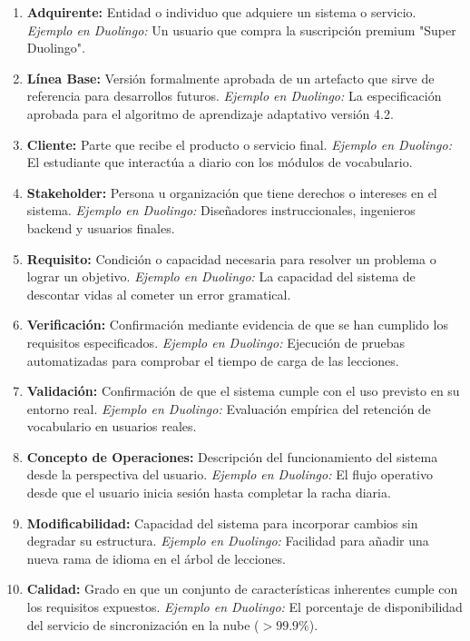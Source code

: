 \documentclass[11pt, a4paper]{article}
\begin{document}
\begin{enumerate}
    \item \textbf{Adquirente:} Entidad o individuo que adquiere un sistema o servicio. \textit{Ejemplo en Duolingo:} Un usuario que compra la suscripción premium "Super Duolingo".
    \item \textbf{Línea Base:} Versión formalmente aprobada de un artefacto que sirve de referencia para desarrollos futuros. \textit{Ejemplo en Duolingo:} La especificación aprobada para el algoritmo de aprendizaje adaptativo versión 4.2.
    \item \textbf{Cliente:} Parte que recibe el producto o servicio final. \textit{Ejemplo en Duolingo:} El estudiante que interactúa a diario con los módulos de vocabulario.
    \item \textbf{Stakeholder:} Persona u organización que tiene derechos o intereses en el sistema. \textit{Ejemplo en Duolingo:} Diseñadores instruccionales, ingenieros backend y usuarios finales.
    \item \textbf{Requisito:} Condición o capacidad necesaria para resolver un problema o lograr un objetivo. \textit{Ejemplo en Duolingo:} La capacidad del sistema de descontar vidas al cometer un error gramatical.
    \item \textbf{Verificación:} Confirmación mediante evidencia de que se han cumplido los requisitos especificados. \textit{Ejemplo en Duolingo:} Ejecución de pruebas automatizadas para comprobar el tiempo de carga de las lecciones.
    \item \textbf{Validación:} Confirmación de que el sistema cumple con el uso previsto en su entorno real. \textit{Ejemplo en Duolingo:} Evaluación empírica del retención de vocabulario en usuarios reales.
    \item \textbf{Concepto de Operaciones:} Descripción del funcionamiento del sistema desde la perspectiva del usuario. \textit{Ejemplo en Duolingo:} El flujo operativo desde que el usuario inicia sesión hasta completar la racha diaria.
    \item \textbf{Modificabilidad:} Capacidad del sistema para incorporar cambios sin degradar su estructura. \textit{Ejemplo en Duolingo:} Facilidad para añadir una nueva rama de idioma en el árbol de lecciones.
    \item \textbf{Calidad:} Grado en que un conjunto de características inherentes cumple con los requisitos expuestos. \textit{Ejemplo en Duolingo:} El porcentaje de disponibilidad del servicio de sincronización en la nube ($>99.9\%$).
\end{enumerate}
\end{document}
